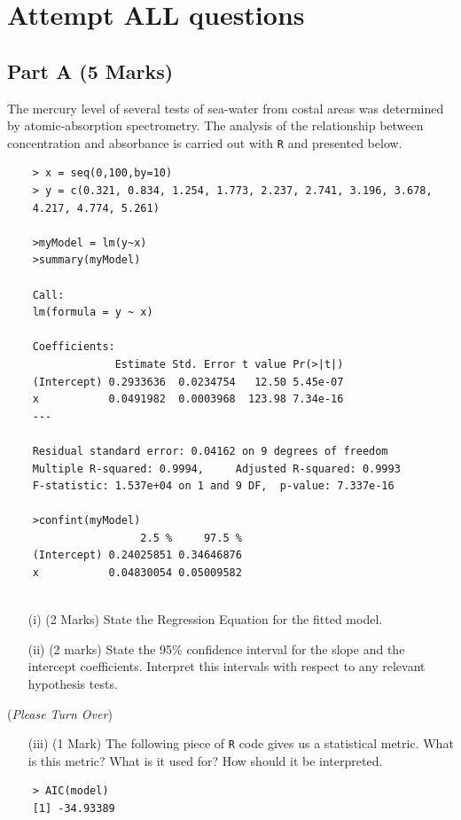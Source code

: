 \documentclass[a4paper,12pt]{article}
\begin{document}
\section*{Attempt ALL questions}



\subsection*{Part A (5 Marks)}

The mercury level of several tests of sea-water from costal areas was determined by atomic-absorption spectrometry. The analysis of the relationship between concentration and absorbance is carried out with \texttt{R} and presented below. 
\begin{framed}
	\begin{verbatim}
	> x = seq(0,100,by=10)
	> y = c(0.321, 0.834, 1.254, 1.773, 2.237, 2.741, 3.196, 3.678, 
	4.217, 4.774, 5.261)
	
	>myModel = lm(y~x)
	>summary(myModel)
	
	Call:
	lm(formula = y ~ x)
	
	Coefficients:
	             Estimate Std. Error t value Pr(>|t|)    
	(Intercept) 0.2933636  0.0234754   12.50 5.45e-07 
	x           0.0491982  0.0003968  123.98 7.34e-16 
	---
	
	Residual standard error: 0.04162 on 9 degrees of freedom
	Multiple R-squared: 0.9994,     Adjusted R-squared: 0.9993 
	F-statistic: 1.537e+04 on 1 and 9 DF,  p-value: 7.337e-16 
	
	>confint(myModel)
	                 2.5 %     97.5 %
	(Intercept) 0.24025851 0.34646876
	x           0.04830054 0.05009582
	
	\end{verbatim}
\end{framed}

\begin{itemize}
	\item[(i)] (2 Marks) State the Regression Equation for the fitted model.

	\item[(ii)]  (2 marks) State the 95\% confidence interval for the slope and the intercept coefficients. Interpret this intervals with respect to any relevant hypothesis tests.
\end{itemize} \medskip
	(\textit{Please Turn Over})
	\newpage
\begin{itemize}
	\item[(iii)] (1 Mark) The following piece of \texttt{R} code gives us a statistical metric. What is this metric? What is it used for? How should it be interpreted.
\end{itemize}
\begin{framed}
	\begin{verbatim}
	> AIC(model)
	[1] -34.93389	
	\end{verbatim}
\end{framed}
\end{document}
